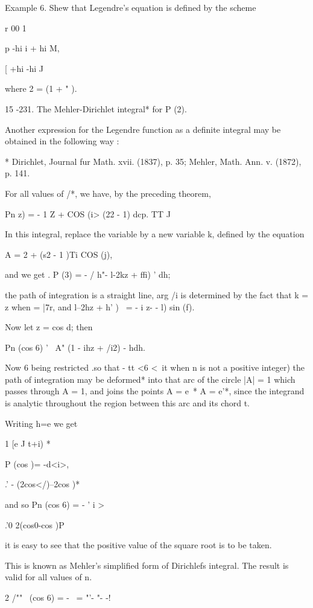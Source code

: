 {{Example 6. Shew that Legendre's equation is defined by the scheme

r 00 1

p -hi i + hi M,

[ +hi -hi J

where 2 = (1 + " ).

15 -231. The Mehler-Dirichlet integral* for P (2).

Another expression for the Legendre function as a definite integral
may be obtained in the following way :

* Dirichlet, Journal fur Math. xvii. (1837), p. 35; Mehler, Math. Ann.
v. (1872), p. 141.

%
%

For all values of /*, we have, by the preceding theorem,

Pn z) = - 1 Z + COS (i> (22 - 1) dcp. TT J

In this integral, replace the variable by a new variable k, defined by
the equation

A = 2 + (s2 - 1 )Ti COS (j),

and we get . P (3) = - / h"- l-2kz + ffi) ' dh;

the path of integration is a straight line, arg /i is determined by
the fact that k = z when = |7r, and l--2hz + h' )~ = - i z- - l) sin
(f).

Now let z = cos d; then

Pn (cos 6) ' \ A" (1 - ihz + /i2) - hdh.

Now 6 being restricted .so that - tt <6 <\ it when n is not a positive
integer) the path of integration may be deformed* into that arc of the
circle |A| = 1 which passes through A = 1, and joins the points A =
e~* A = e'*, since the integrand is analytic throughout the region
between this arc and its chord t.

Writing h=e we get

1 [e J t+i) *

P (cos )= -d<i>,

  .' - (2cos</)--2cos )*

and so Pn (cos 6) = - ' i >

 .'0 2(cos0-cos )P

it is easy to see that the positive value of the square root is to be
taken.

This is known as Mehler's simplified form of Dirichlefs integral. The
result is valid for all values of n.

2 /"" \ (cos 6) = - \ = "'- "- -! 

}}

